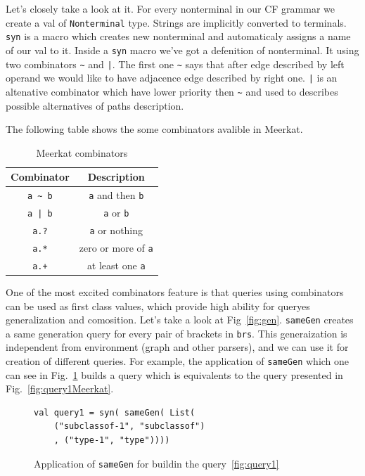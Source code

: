 Let's closely take a look at it.
For every nonterminal in our CF grammar we create a val of  \lstinline{Nonterminal} type.
Strings are implicitly converted to terminals.
\lstinline{syn} is a macro which creates new nonterminal and automaticaly assigns a name of our val to it.
Inside a \lstinline{syn} macro we've got a defenition of nonterminal.
It using two combinators \lstinline{~} and \lstinline{|}.
The first one \lstinline{~} says that after edge described by left operand we would like to have adjacence edge described by right one.
\lstinline{|} is an altenative combinator which have lower priority then \lstinline{~} and used to describes possible alternatives of paths description.

The following table shows the some combinators avalible in Meerkat. 

\begin{table}[h]
\centering
\begin{tabular}{|c|c|}
\hline
\multicolumn{1}{|c|}{Combinator} & \multicolumn{1}{c|}{Description} \\ \hline
{\lstinline!a ~ b!} & {\lstinline!a!} and then {\lstinline!b!}   \\
{\lstinline!a | b!} & {\lstinline!a!} or {\lstinline!b!}         \\
{\lstinline!a.?!}   & {\lstinline!a!} or nothing   \\
{\lstinline!a.*!}   & zero or more of {\lstinline!a!} \\
{\lstinline!a.+!}   & at least one {\lstinline!a!} \\
\hline
\end{tabular}
\caption{Meerkat combinators}
\label{table:combinators}
\end{table}

One of the most excited combinators feature is that queries using combinators can be used as first class values, which provide high ability for queryes generalization and comosition.
Let's take a look at Fig~\ref{fig:gen}. \lstinline{sameGen} creates a same generation query for every pair of brackets in \lstinline{brs}.
This generaization is independent from environment (graph and other parsers), and we can use it for creation of different queries.
For example, the application of \lstinline{sameGen} which one can see in Fig.~\ref{fig:query1Gen} builds a query which is equivalents to the query presented in Fig.~\ref{fig:query1Meerkat}.

\begin{figure}[h]
\begin{lstlisting}
val query1 = syn( sameGen( List(
    ("subclassof-1", "subclassof")
    , ("type-1", "type"))))
\end{lstlisting}
\caption{Application of \lstinline{sameGen} for buildin the query~\ref{fig:query1}}
\label{fig:query1Gen}
\end{figure}

